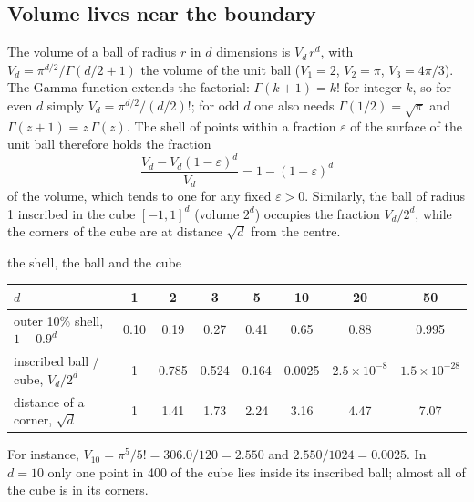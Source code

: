 \documentclass[11pt]{article}
\begin{document}
\subsection{Volume lives near the boundary}\label{sec:shell}

The volume of a ball of radius $r$ in $d$ dimensions is $V_d\, r^d$, with
$V_d = \pi^{d/2} / \Gamma(d/2 + 1)$ the volume of the unit ball ($V_1 = 2$, $V_2 = \pi$, $V_3 = 4\pi/3$). The Gamma
function extends the factorial: $\Gamma(k + 1) = k!$ for integer $k$, so for even $d$ simply
$V_d = \pi^{d/2}/(d/2)!$; for odd $d$ one also needs $\Gamma(1/2) = \sqrt\pi$ and $\Gamma(z + 1) = z\,\Gamma(z)$. The shell of
points within a fraction $\varepsilon$ of the surface of the unit ball therefore holds the fraction
\[
  \frac{V_d - V_d (1 - \varepsilon)^d}{V_d} = 1 - (1 - \varepsilon)^d
\]
of the volume, which tends to one for any fixed $\varepsilon > 0$. Similarly, the ball of radius 1 inscribed in the
cube $[-1, 1]^d$ (volume $2^d$) occupies the fraction $V_d / 2^d$, while the corners of the cube are at distance
$\sqrt d$ from the centre.

\begin{worked}{the shell, the ball and the cube}
\begin{center}\small
\begin{tabular}{@{}lccccccc@{}}\toprule
$d$ & 1 & 2 & 3 & 5 & 10 & 20 & 50 \\ \midrule
outer 10\% shell, $1 - 0.9^d$ & 0.10 & 0.19 & 0.27 & 0.41 & 0.65 & 0.88 & 0.995 \\
inscribed ball / cube, $V_d / 2^d$ & 1 & 0.785 & 0.524 & 0.164 & 0.0025 & $2.5 \times 10^{-8}$ & $1.5 \times 10^{-28}$ \\
distance of a corner, $\sqrt d$ & 1 & 1.41 & 1.73 & 2.24 & 3.16 & 4.47 & 7.07 \\ \bottomrule
\end{tabular}
\end{center}
For instance, $V_{10} = \pi^5/5! = 306.0/120 = 2.550$ and $2.550/1024 = 0.0025$. In $d = 10$ only one point in 400
of the cube lies inside its inscribed ball; almost all of the cube is in its corners.
\end{worked}
\end{document}
